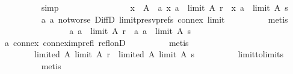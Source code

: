 \begin{isabellebody}
\ \ \ \ \ \ \ \ \isamarkupfalse%
\ simp\isanewline
\ \ \ \ \ \ \isamarkupfalse%
\ \isamarkupfalse%
\isanewline
\ \ \ \ \ \ \ \ {\isachardoublequoteopen}{\isasymforall}x\ {\isasymin}\ A\ {\isacharminus}{\kern0pt}\ {\isacharbraceleft}{\kern0pt}a{\isacharbraceright}{\kern0pt}{\isachardot}{\kern0pt}\ {\isacharparenleft}{\kern0pt}x{\isacharcomma}{\kern0pt}\ a{\isacharparenright}{\kern0pt}\ {\isasymin}\ {\isacharparenleft}{\kern0pt}limit\ A\ r{\isacharparenright}{\kern0pt}\ {\isasymlongleftrightarrow}\ {\isacharparenleft}{\kern0pt}x{\isacharcomma}{\kern0pt}\ a{\isacharparenright}{\kern0pt}\ {\isasymin}\ {\isacharparenleft}{\kern0pt}limit\ A\ s{\isacharparenright}{\kern0pt}{\isachardoublequoteclose}\isanewline
\ \ \ \ \ \ \ \ \isamarkupfalse%
\ a{}\ a{}{\isacharunderscore}{\kern0pt}{}\ not{\isacharunderscore}{\kern0pt}worse\ DiffD{}\ limit{\isacharunderscore}{\kern0pt}presv{\isacharunderscore}{\kern0pt}prefs{}\ connex{}\ limit{}\isanewline
\ \ \ \ \ \ \ \ \isamarkupfalse%
\ metis\isanewline
\ \ \ \ \ \ \isamarkupfalse%
\ \isamarkupfalse%
\isanewline
\ \ \ \ \ \ \ \ {\isachardoublequoteopen}{\isacharparenleft}{\kern0pt}a{\isacharcomma}{\kern0pt}\ a{\isacharparenright}{\kern0pt}\ {\isasymin}\ {\isacharparenleft}{\kern0pt}limit\ A\ r{\isacharparenright}{\kern0pt}\ {\isasymand}\ {\isacharparenleft}{\kern0pt}a{\isacharcomma}{\kern0pt}\ a{\isacharparenright}{\kern0pt}\ {\isasymin}\ {\isacharparenleft}{\kern0pt}limit\ A\ s{\isacharparenright}{\kern0pt}{\isachardoublequoteclose}\isanewline
\ \ \ \ \ \ \ \ \isamarkupfalse%
\ a{}\ connex\ connex{\isacharunderscore}{\kern0pt}imp{\isacharunderscore}{\kern0pt}refl\ refl{\isacharunderscore}{\kern0pt}onD\isanewline
\ \ \ \ \ \ \ \ \isamarkupfalse%
\ metis\isanewline
\ \ \ \ \ \ \isamarkupfalse%
\ \isamarkupfalse%
\isanewline
\ \ \ \ \ \ \ \ {\isachardoublequoteopen}limited\ A\ {\isacharparenleft}{\kern0pt}limit\ A\ r{\isacharparenright}{\kern0pt}\ {\isasymand}\ limited\ A\ {\isacharparenleft}{\kern0pt}limit\ A\ s{\isacharparenright}{\kern0pt}{\isachardoublequoteclose}\isanewline
\ \ \ \ \ \ \ \ \isamarkupfalse%
\ limit{\isacharunderscore}{\kern0pt}to{\isacharunderscore}{\kern0pt}limits\isanewline
\ \ \ \ \ \ \ \ \isamarkupfalse%
\ metis\isanewline
\ \ \ \ \ \ \isamarkupfalse%
\ \isamarkupfalse%

\end{isabellebody}
